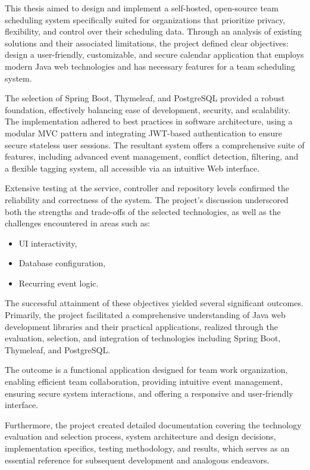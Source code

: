 This thesis aimed to design and implement a self-hosted, open-source team scheduling system specifically suited for organizations that prioritize privacy, flexibility, and control over their scheduling data.
Through an analysis of existing solutions and their associated limitations, the project defined clear objectives:
design a user-friendly, customizable, and secure calendar application that employs modern Java web technologies and has necessary features for a team scheduling system.

The selection of Spring Boot, Thymeleaf, and PostgreSQL provided a robust foundation, effectively balancing ease of development, security, and scalability.
The implementation adhered to best practices in software architecture, using a modular MVC pattern and integrating JWT-based authentication to ensure secure stateless user sessions.
The resultant system offers a comprehensive suite of features, including advanced event management, conflict detection, filtering, and a flexible tagging system, all accessible via an intuitive Web interface.

Extensive testing at the service, controller and repository levels confirmed the reliability and correctness of the system.
The project's discussion underscored both the strengths and trade-offs of the selected technologies, as well as the challenges encountered in areas such as:
\begin{itemize}
    \item UI interactivity,
    \item Database configuration,
    \item Recurring event logic.
\end{itemize}
The successful attainment of these objectives yielded several significant outcomes.
Primarily, the project facilitated a comprehensive understanding of Java web development libraries and their practical applications, realized through the evaluation, selection, and integration of technologies including Spring Boot, Thymeleaf, and PostgreSQL\@.

The outcome is a functional application designed for team work organization, enabling efficient team collaboration, providing intuitive event management, ensuring secure system interactions, and offering a responsive and user-friendly interface.

Furthermore, the project created detailed documentation covering the technology evaluation and selection process, system architecture and design decisions, implementation specifics, testing methodology, and results, which serves as an essential reference for subsequent development and analogous endeavors.

